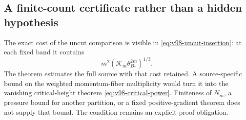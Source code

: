 \subsection{A finite-count certificate rather than a hidden hypothesis}
The exact cost of the uncut comparison is visible in
\eqref{eq:v98-uncut-insertion}: at each fixed band it contains
\[
 m^2(\mathcal K_m\theta_{B_*}^{2m})^{1/3}.
\]
The theorem estimates the full source with that cost retained. A
source-specific bound on the weighted momentum-fiber multiplicity
would turn it into the vanishing critical-height theorem
\eqref{eq:v98-critical-power}. Finiteness of $N_m$, a pressure bound
for another partition, or a fixed positive-gradient theorem does not
supply that bound. The condition remains an explicit proof obligation.
